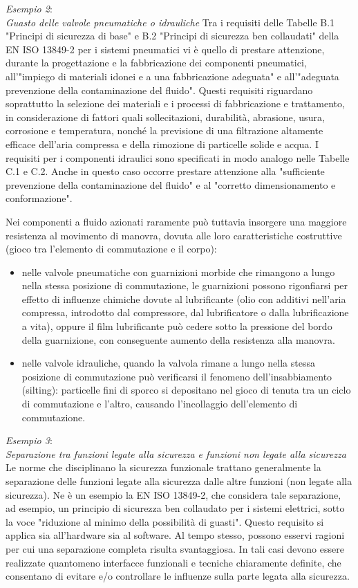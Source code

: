 \textit{Esempio 2}:\\
\textit{Guasto delle valvole pneumatiche o idrauliche}
Tra i requisiti delle Tabelle B.1 "Principi di sicurezza di base" e B.2 "Principi di sicurezza ben collaudati" della EN ISO 13849-2 per i sistemi pneumatici vi è quello di prestare attenzione, durante la progettazione e la fabbricazione dei componenti pneumatici, all'"impiego di materiali idonei e a una fabbricazione adeguata" e all'"adeguata prevenzione della contaminazione del fluido". Questi requisiti riguardano soprattutto la selezione dei materiali e i processi di fabbricazione e trattamento, in considerazione di fattori quali sollecitazioni, durabilità, abrasione, usura, corrosione e temperatura, nonché la previsione di una filtrazione altamente efficace dell'aria compressa e della rimozione di particelle solide e acqua. I requisiti per i componenti idraulici sono specificati in modo analogo nelle Tabelle C.1 e C.2. Anche in questo caso occorre prestare attenzione alla "sufficiente prevenzione della contaminazione del fluido" e al "corretto dimensionamento e conformazione".

Nei componenti a fluido azionati raramente può tuttavia insorgere una maggiore resistenza al movimento di manovra, dovuta alle loro caratteristiche costruttive (gioco tra l'elemento di commutazione e il corpo):
\begin{itemize}
    \item nelle valvole pneumatiche con guarnizioni morbide che rimangono a lungo nella stessa posizione di commutazione, le guarnizioni possono rigonfiarsi per effetto di influenze chimiche dovute al lubrificante (olio con additivi nell'aria compressa, introdotto dal compressore, dal lubrificatore o dalla lubrificazione a vita), oppure il film lubrificante può cedere sotto la pressione del bordo della guarnizione, con conseguente aumento della resistenza alla manovra.
    \item nelle valvole idrauliche, quando la valvola rimane a lungo nella stessa posizione di commutazione può verificarsi il fenomeno dell'insabbiamento (silting): particelle fini di sporco si depositano nel gioco di tenuta tra un ciclo di commutazione e l'altro, causando l'incollaggio dell'elemento di commutazione.
\end{itemize}

\textit{Esempio 3}:\\
\textit{Separazione tra funzioni legate alla sicurezza e funzioni non legate alla sicurezza}
Le norme che disciplinano la sicurezza funzionale trattano generalmente la separazione delle funzioni legate alla sicurezza dalle altre funzioni (non legate alla sicurezza). Ne è un esempio la EN ISO 13849-2, che considera tale separazione, ad esempio, un principio di sicurezza ben collaudato per i sistemi elettrici, sotto la voce "riduzione al minimo della possibilità di guasti". Questo requisito si applica sia all'hardware sia al software. Al tempo stesso, possono esservi ragioni per cui una separazione completa risulta svantaggiosa. In tali casi devono essere realizzate quantomeno interfacce funzionali e tecniche chiaramente definite, che consentano di evitare e/o controllare le influenze sulla parte legata alla sicurezza.

